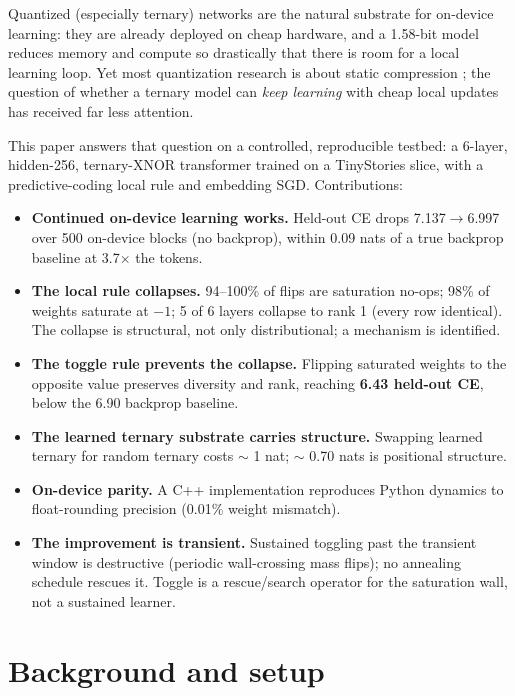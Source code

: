 \documentclass{article} %
\begin{document}
Quantized (especially ternary) networks are the natural substrate for on-device learning: they are already deployed on cheap hardware, and a 1.58-bit model \citep{ma20241bit, wang2023bitnet} reduces memory and compute so drastically that there is room for a local learning loop. Yet most quantization research is about static compression \citep{frantar2024gptq,lin2024awq,dettmers2022llmint8}; the question of whether a ternary model can \emph{keep learning} with cheap local updates has received far less attention.

This paper answers that question on a controlled, reproducible testbed: a 6-layer, hidden-256, ternary-XNOR transformer trained on a TinyStories \citep{eldan2023tinystories} slice, with a predictive-coding local rule and embedding SGD. Contributions:

\begin{itemize}
\item \textbf{Continued on-device learning works.} Held-out CE drops 7.137$\rightarrow$6.997 over 500 on-device blocks (no backprop), within 0.09 nats of a true backprop baseline at 3.7$\times$ the tokens.
\item \textbf{The local rule collapses.} 94--100\% of flips are saturation no-ops; 98\% of weights saturate at $-1$; 5 of 6 layers collapse to rank 1 (every row identical). The collapse is structural, not only distributional; a mechanism is identified.
\item \textbf{The toggle rule prevents the collapse.} Flipping saturated weights to the opposite value preserves diversity and rank, reaching \textbf{6.43 held-out CE}, below the 6.90 backprop baseline.
\item \textbf{The learned ternary substrate carries structure.} Swapping learned ternary for random ternary costs $\sim$ 1 nat; $\sim$ 0.70 nats is positional structure.
\item \textbf{On-device parity.} A C++ implementation reproduces Python dynamics to float-rounding precision (0.01\% weight mismatch).
\item \textbf{The improvement is transient.} Sustained toggling past the transient window is destructive (periodic wall-crossing mass flips); no annealing schedule rescues it. Toggle is a rescue/search operator for the saturation wall, not a sustained learner.
\end{itemize}

\section{Background and setup}
\label{sec:setup}
\end{document}
